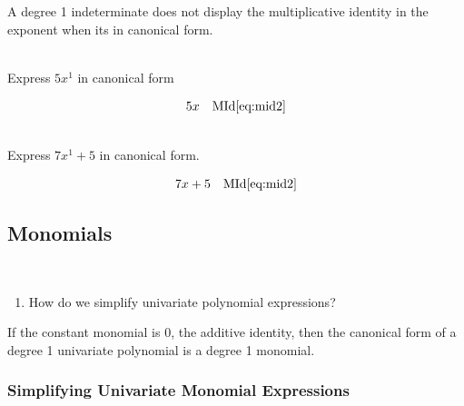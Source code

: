 \documentclass[20150903-160354-rs2.2-MarksMathNotebook.tex]{subfiles}
\begin{document}
\begin{remark}
A degree 1 indeterminate does not display the multiplicative identity in the exponent when its in canonical form.
\end{remark}

\begin{example}[id:20141120-202042] \label{20141120-202042} \hfill \\

Express $5x^1$ in canonical form

\soln

\solnsteps
\begin{align*}
5x && \text{MId} \eqref{eq:mid2}
\end{align*}
\end{example}

\begin{example}[id:20141121-093439] \label{20141121-093439} \hfill \\

Express $7x^1+5$ in canonical form.

\soln

\solnsteps
\begin{align*}
7x+5 && \text{MId} \eqref{eq:mid2} \\
\end{align*}
\end{example}

\subsection*{Monomials}

\begin{essentialq}\hfill \\

\begin{enumerate}
	\item How do we simplify univariate polynomial expressions?
\end{enumerate}

\end{essentialq}


If the constant monomial is 0, the additive identity, then the canonical form of a degree 1 univariate polynomial is a degree 1 monomial.

\subsubsection{Simplifying Univariate Monomial Expressions}
\end{document}
